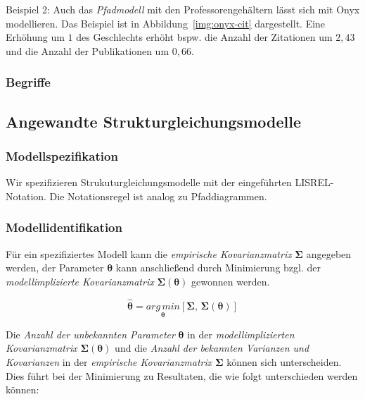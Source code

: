 \documentclass{article}
\numberwithin{equation}{section}
\begin{document}
Beispiel 2: Auch das \emph{Pfadmodell} mit den Professorengehältern lässt sich mit Onyx modellieren. Das Beispiel ist in Abbildung~\ref{img:onyx-cit} dargestellt. Eine Erhöhung um $1$ des Geschlechts erhöht bspw. die Anzahl der Zitationen um $2,43$ und die Anzahl der Publikationen um $0,66$.

\subsubsection*{Begriffe}


\subsection{Angewandte Strukturgleichungsmodelle}

\subsubsection{Modellspezifikation}

Wir spezifizieren Strukuturgleichungsmodelle mit der eingeführten LISREL-Notation. Die Notationsregel ist analog zu Pfaddiagrammen.

\subsubsection{Modellidentifikation}

Für ein spezifiziertes Modell kann die \emph{empirische Kovarianzmatrix} $\boldsymbol\Sigma$ angegeben werden, der Parameter $\boldsymbol\theta$ kann anschließend durch Minimierung bzgl. der \emph{modellimplizierte Kovarianzmatrix} $\boldsymbol\Sigma(\boldsymbol\theta)$ gewonnen werden.

\begin{equation}
\hat{\boldsymbol\theta} = \underset{\boldsymbol\theta}{arg\,min} \left[ \boldsymbol\Sigma,\,\boldsymbol\Sigma(\boldsymbol\theta) \right]
\end{equation}

Die \emph{Anzahl der unbekannten Parameter} $\boldsymbol\theta$ in der \emph{modellimplizierten Kovarianzmatrix} $\boldsymbol\Sigma(\boldsymbol\theta)$ und die \emph{Anzahl der bekannten Varianzen und Kovarianzen} in der \emph{empirische Kovarianzmatrix} $\boldsymbol\Sigma$ können sich unterscheiden. Dies führt bei der Minimierung zu Resultaten, die wie folgt unterschieden werden können:
\end{document}
